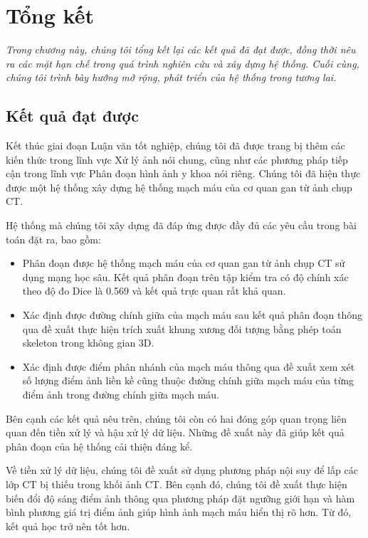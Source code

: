 \chapter{Tổng kết}
\label{chap:tong_ket}
	\textit{Trong chương này, chúng tôi tổng kết lại các kết quả đã đạt được, đồng thời nêu ra các mặt hạn chế trong quá trình nghiên cứu và xây dựng hệ thống. Cuối cùng, chúng tôi trình bày hướng mở rộng, phát triển của hệ thống trong tương lai.}
\minitoc

\section{Kết quả đạt được}
\label{sec:ket_qua_dat_duoc}
	Kết thúc giai đoạn Luận văn tốt nghiệp, chúng tôi đã được trang bị thêm các kiến thức trong lĩnh vực Xử lý ảnh nói chung, cũng như các phương pháp tiếp cận trong lĩnh vực Phân đoạn hình ảnh y khoa nói riêng. Chúng tôi đã hiện thực được một hệ thống xây dựng hệ thống mạch máu của cơ quan gan từ ảnh chụp CT.
	
	Hệ thống mà chúng tôi xây dựng đã đáp ứng được đầy đủ các yêu cầu trong bài toán đặt ra, bao gồm:
	\begin{itemize}
		\item Phân đoạn được hệ thống mạch máu của cơ quan gan từ ảnh chụp CT sử dụng mạng học sâu. Kết quả phân đoạn trên tập kiểm tra có độ chính xác theo độ đo Dice là 0.569 và kết quả trực quan rất khả quan.
		\item Xác định được đường chính giữa của mạch máu sau kết quả phân đoạn thông qua đề xuất thực hiện trích xuất khung xương đối tượng bằng phép toán skeleton trong không gian 3D.
		\item Xác định được điểm phân nhánh của mạch máu thông qua đề xuất xem xét số lượng điểm ảnh liền kề cũng thuộc đường chính giữa mạch máu của từng điểm ảnh trong đường chính giữa mạch máu.
	\end{itemize}
	
	 Bên cạnh các kết quả nêu trên, chúng tôi còn có hai đóng góp quan trọng liên quan đến tiền xử lý và hậu xử lý dữ liệu. Những đề xuất này đã giúp kết quả phân đoạn của hệ thống cải thiện đáng kể.
	 
	 Về tiền xử lý dữ liệu, chúng tôi đề xuất sử dụng phương pháp nội suy để lấp các lớp CT bị thiếu trong khối ảnh CT. Bên cạnh đó, chúng tôi đề xuất thực hiện biến đổi độ sáng điểm ảnh thông qua phương pháp đặt ngưỡng giới hạn và hàm bình phương giá trị điểm ảnh giúp hình ảnh mạch máu hiển thị rõ hơn. Từ đó, kết quả học trở nên tốt hơn.
	 
